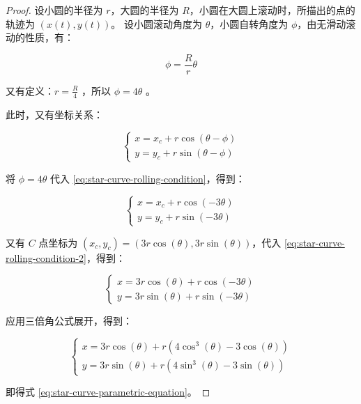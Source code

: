 \documentclass[11pt]{article}
\numberwithin{equation}{section}
\numberwithin{theorem}{section}
\begin{document}
\begin{proof}
  设小圆的半径为 $r$，大圆的半径为 $R$，小圆在大圆上滚动时，所描出的点的轨迹为 $(x(t), y(t))$。
  设小圆滚动角度为 $\theta$，小圆自转角度为 $\phi$，由无滑动滚动的性质，有：

  \begin{equation}\label{eq:rolling-condition}
    \phi = \frac{R}{r} \theta
  \end{equation}

  又有定义：$r = \frac{R}{4}$ ，所以 $\phi = 4\theta$ 。

  此时，又有坐标关系：

  \begin{equation}\label{eq:star-curve-rolling-condition}
    \begin{cases}
      x = x_c + r \cos(\theta - \phi) \\
      y = y_c + r \sin(\theta - \phi)
    \end{cases}
  \end{equation}

  将 $\phi = 4\theta$ 代入 \eqref{eq:star-curve-rolling-condition}，得到：

  \begin{equation}\label{eq:star-curve-rolling-condition-2}
    \begin{cases}
      x = x_c + r \cos(-3\theta) \\
      y = y_c + r \sin(-3\theta)
    \end{cases}
  \end{equation}

  又有 $C$ 点坐标为 $(x_c, y_c) = (3r \cos(\theta), 3r \sin(\theta))$，代入 \eqref{eq:star-curve-rolling-condition-2}，得到：

  \begin{equation}\label{eq:star-curve-rolling-condition-3}
    \begin{cases}
      x = 3r \cos(\theta) + r \cos(-3\theta) \\
      y = 3r \sin(\theta) + r \sin(-3\theta)
    \end{cases}
  \end{equation}

  应用三倍角公式展开，得到：

  \begin{equation}\label{eq:star-curve-rolling-condition-4}
    \begin{cases}
      x = 3r \cos(\theta) + r (4\cos^3(\theta) - 3\cos(\theta)) \\
      y = 3r \sin(\theta) + r (4\sin^3(\theta) - 3\sin(\theta))
    \end{cases}
  \end{equation}

  即得式 \eqref{eq:star-curve-parametric-equation}。

\end{proof}
\end{document}
